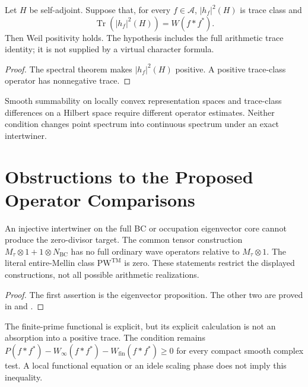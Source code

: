 \begin{proposition}
\label{v4-arith:w9-r4:thm:meyer-eq-HPAr}
Let \(H\) be self-adjoint. Suppose that, for every
\(f\in\mathscr A\), \(|h_f|^2(H)\) is trace class and
\[
 \operatorname{Tr}(|h_f|^2(H))=W(f*f^*).
\]
Then Weil positivity holds. The hypothesis includes the full
arithmetic trace identity; it is not supplied by a virtual
character formula.
\end{proposition}
\begin{proof}
The spectral theorem makes \(|h_f|^2(H)\) positive.
A positive trace-class operator has nonnegative trace.
\end{proof}

\begin{remark}
\label{v4-arith:w9-r4:rem:meyer-schwartz-only}
Smooth summability on locally convex representation spaces and
trace-class differences on a Hilbert space require different
operator estimates. Neither condition changes point spectrum
into continuous spectrum under an exact intertwiner.
\end{remark}

\section{Obstructions to the Proposed Operator Comparisons}
\label{v4-arith:w9-r4:residual}
\label{v4-arith:w9-r4:residual:statement}
\begin{theorem}
\label{v4-arith:w9-r4:thm:irreducible-residual}
An injective intertwiner on the full BC or occupation eigenvector
core cannot produce the zero-divisor target.
The common tensor construction
\(M_\tau\otimes1+1\otimes N_{\mathrm{BC}}\) has no full ordinary wave
operators relative to \(M_\tau\otimes1\).
The literal entire-Mellin class \(\mathrm{PW}^{\mathrm{TM}}\) is zero.
These statements restrict the displayed constructions, not all
possible arithmetic realizations.
\end{theorem}
\begin{proof}
The first assertion is the eigenvector proposition.
The other two are proved in
 and
.
\end{proof}

\begin{remark}
\label{v4-arith:w9-r4:rem:residual-at-infty}
The finite-prime functional is explicit, but its explicit
calculation is not an absorption into a positive trace.
The condition remains
\(P(f*f^*)-W_\infty(f*f^*)-W_{\mathrm{fin}}(f*f^*)\geq0\)
for every compact smooth complex test. A local functional equation
or an idele scaling phase does not imply this inequality.
\end{remark}

